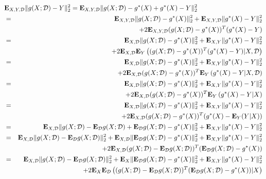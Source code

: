\begin{eqnarray*}
\lefteqn{
\Expect_{X,Y,\dataset} \|g(X;\dataset) - Y\|_2^2
= \Expect_{X,Y,\dataset} \|g(X;\dataset) -g^\ast(X) + g^\ast(X)- Y\|_2^2
}
\\
&=&
	\Expect_{X,Y,\dataset} \|g(X;\dataset) -g^\ast(X) \|_2^2
	+ \Expect_{X,Y,\dataset} \|g^\ast(X)- Y\|_2^2
\\
&&
	+ 2 \Expect_{X,Y,\dataset} (g(X;\dataset) -g^\ast(X) )^T( g^\ast(X)- Y)
\\
&=&
	\Expect_{X,\dataset} \|g(X;\dataset) -g^\ast(X) \|_2^2
	+ \Expect_{X,Y} \|g^\ast(X)- Y\|_2^2
\\
&&
	+ 2 \Expect_{X,\dataset}  \Expect_Y \left( (g(X;\dataset) -g^\ast(X) )^T( g^\ast(X)- Y) |X,\dataset \right)
\\
&=&
	\Expect_{X,\dataset} \|g(X;\dataset) -g^\ast(X) \|_2^2
	+ \Expect_{X,Y} \|g^\ast(X)- Y\|_2^2
\\
&&
	+ 2 \Expect_{X,\dataset}  (g(X;\dataset) -g^\ast(X) )^T\Expect_Y \left( g^\ast(X)- Y |X,\dataset \right)
\\
&=&
	\Expect_{X,\dataset} \|g(X;\dataset) -g^\ast(X) \|_2^2
	+ \Expect_{X,Y} \|g^\ast(X)- Y\|_2^2
\\
&&
	+ 2 \Expect_{X,\dataset}  (g(X;\dataset) -g^\ast(X) )^T\Expect_Y \left( g^\ast(X)- Y |X \right)
\\
&=&
	\Expect_{X,\dataset} \|g(X;\dataset) -g^\ast(X) \|_2^2
	+ \Expect_{X,Y} \|g^\ast(X)- Y\|_2^2
\\
&&
	+ 2 \Expect_{X,\dataset}  (g(X;\dataset) -g^\ast(X) )^T( g^\ast(X)- \Expect_Y(Y|X))
\\
&=&
	\Expect_{X,\dataset} \|g(X;\dataset) - \Expect_\dataset g(X; \dataset) + \Expect_\dataset g(X; \dataset) -g^\ast(X) \|_2^2
	+ \Expect_{X,Y} \|g^\ast(X)- Y\|_2^2
\\
&=&
	\Expect_{X,\dataset} \|g(X;\dataset) - \Expect_\dataset g(X; \dataset)\|_2^2
	+ \Expect_{X,\dataset} \| \Expect_\dataset g(X; \dataset) -g^\ast(X) \|_2^2
	+ \Expect_{X,Y} \|g^\ast(X)- Y\|_2^2
\\
&&
	+ 2\Expect_{X,\dataset} (g(X;\dataset) - \Expect_\dataset g(X; \dataset))^T (\Expect_\dataset g(X; \dataset) -g^\ast(X) )
\\
&=&
	\Expect_{X,\dataset} \|g(X;\dataset) - \Expect_\dataset g(X; \dataset)\|_2^2
	+ \Expect_{X} \| \Expect_\dataset g(X; \dataset) -g^\ast(X) \|_2^2
	+ \Expect_{X,Y} \|g^\ast(X)- Y\|_2^2
\\
&&
	+ 2\Expect_{X} \Expect_\dataset \left( (g(X;\dataset) - \Expect_\dataset g(X; \dataset))^T (\Expect_\dataset g(X; \dataset) -g^\ast(X) ) |X\right)

\end{eqnarray*}

